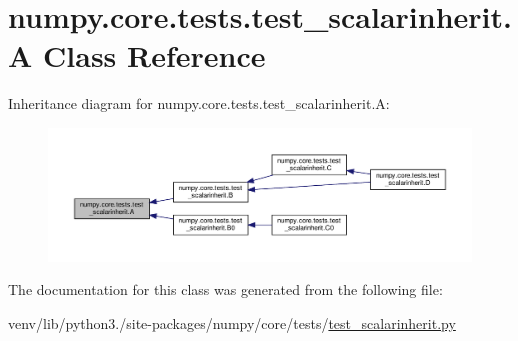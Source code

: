 \hypertarget{classnumpy_1_1core_1_1tests_1_1test__scalarinherit_1_1A}{}\section{numpy.\+core.\+tests.\+test\+\_\+scalarinherit.\+A Class Reference}
\label{classnumpy_1_1core_1_1tests_1_1test__scalarinherit_1_1A}


Inheritance diagram for numpy.\+core.\+tests.\+test\+\_\+scalarinherit.\+A\+:
\nopagebreak
\begin{figure}[H]
\begin{center}
\leavevmode
\includegraphics[width=350pt]{classnumpy_1_1core_1_1tests_1_1test__scalarinherit_1_1A__inherit__graph}
\end{center}
\end{figure}


The documentation for this class was generated from the following file\+:\begin{DoxyCompactItemize}
\item 
venv/lib/python3./site-\/packages/numpy/core/tests/\hyperlink{test__scalarinherit_8py}{test\+\_\+scalarinherit.\+py}\end{DoxyCompactItemize}
